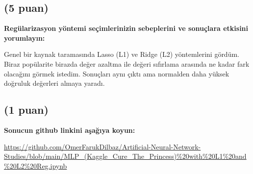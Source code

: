 \documentclass[11pt]{article}
\begin{document}
\subsection{(5 puan)} \textbf{Regülarizasyon yöntemi seçimlerinizin sebeplerini ve sonuçlara etkisini yorumlayın:}

Genel bir kaynak taramasında Lasso (L1) ve Ridge (L2) yöntemlerini gördüm. Biraz popülarite birazda değer azaltma ile değeri sıfırlama arasında ne kadar fark olacağını görmek istedim. Sonuçları aynı çıktı ama normalden daha yüksek doğruluk değerleri almaya yaradı.

\subsection{(1 puan)} \textbf{Sonucun github linkini  aşağıya koyun:}

\url{https://github.com/OmerFarukDilbaz/Artificial-Neural-Network-Studies/blob/main/MLP_(Kaggle_Cure_The_Princess)%20with%20L1%20and%20L2%20Reg.ipynb}
\end{document}
